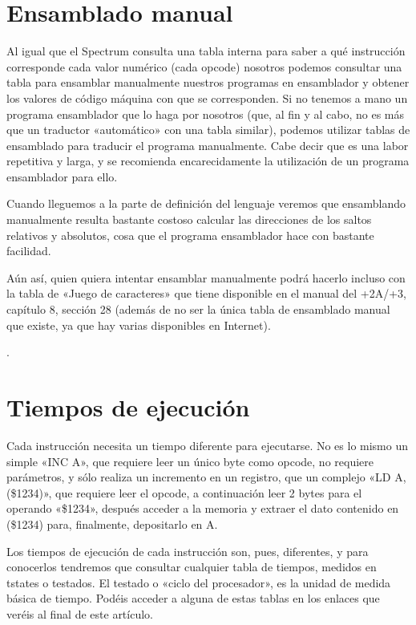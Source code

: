 \documentclass[letterpaper,10pt,spanish]{sphinxmanual}
\begin{document}
\section{Ensamblado manual}
\label{\detokenize{03_arquitectura/arquitectura:ensamblado-manual}}
Al igual que el Spectrum consulta una tabla interna para saber a qué instrucción corresponde cada valor numérico (cada opcode) nosotros podemos consultar una tabla para ensamblar manualmente nuestros programas en ensamblador y obtener los valores de código máquina con que se corresponden. Si no tenemos a mano un programa ensamblador que lo haga por nosotros (que, al fin y al cabo, no es más que un traductor «automático» con una tabla similar), podemos utilizar tablas de ensamblado para traducir el programa manualmente. Cabe decir que es una labor repetitiva y larga, y se recomienda encarecidamente la utilización de un programa ensamblador para ello.

Cuando lleguemos a la parte de definición del lenguaje veremos que ensamblando manualmente resulta bastante costoso calcular las direcciones de los saltos relativos y absolutos, cosa que el programa ensamblador hace con bastante facilidad.

Aún así, quien quiera intentar ensamblar manualmente podrá hacerlo incluso con la tabla de «Juego de caracteres» que tiene disponible en el manual del +2A/+3, capítulo 8, sección 28 (además de no ser la única tabla de ensamblado manual que existe, ya que hay varias disponibles en Internet).

.


\section{Tiempos de ejecución}
\label{\detokenize{03_arquitectura/arquitectura:tiempos-de-ejecucion}}
Cada instrucción necesita un tiempo diferente para ejecutarse. No es lo mismo un simple «INC A», que requiere leer un único byte como opcode, no requiere parámetros, y sólo realiza un incremento en un registro, que un complejo «LD A, (\$1234)», que requiere leer el opcode, a continuación leer 2 bytes para el operando «\$1234», después acceder a la memoria y extraer el dato contenido en (\$1234) para, finalmente, depositarlo en A.

Los tiempos de ejecución de cada instrucción son, pues, diferentes, y para conocerlos tendremos que consultar cualquier tabla de tiempos, medidos en t\sphinxhyphen{}states o t\sphinxhyphen{}estados. El t\sphinxhyphen{}estado o «ciclo del procesador», es la unidad de medida básica de tiempo. Podéis acceder a alguna de estas tablas en los enlaces que veréis al final de este artículo.
\end{document}
